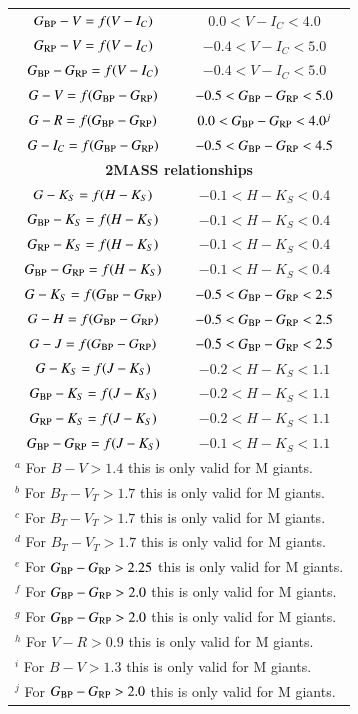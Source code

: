 \documentclass{aa}
\newcommand{\gbp}{\ensuremath{G_{\rm BP}}\xspace}
\newcommand{\grp}{\ensuremath{G_{\rm RP}}\xspace}
\newcommand{\bprp}{\ensuremath{G_{\rm BP}-G_{\rm RP}}\xspace}
\begin{document}
\begin{appendix}
\begin{table}
\begin{center}
\begin{tabular}{c c}
$\gbp-V=f(V-I_C)$				 & $0.0<V-I_C<4.0$\\ 
$\grp-V=f(V-I_C)$		 		 & $-0.4<V-I_C<5.0$\\ 
$\bprp=f(V-I_C)$	 			 & $-0.4<V-I_C<5.0$\\ 
$\gmag-V=f(\bprp)$	 			 & $-0.5<\bprp<5.0$\\
$\gmag-R=f(\bprp)$	 			 & $0.0<\bprp<4.0^j$\\
$\gmag-I_C=f(\bprp)$	 			 & $-0.5<\bprp<4.5$\\
\hline
\multicolumn{2}{c}{\textbf{2MASS relationships}}\\
$G-K_S=f(H-K_S)$			  	  & $-0.1<H-K_S<0.4$\\
 $\gbp-K_S=f(H-K_S)$			  	  & $-0.1<H-K_S<0.4$\\
 $\grp-K_S=f(H-K_S)$			  	  & $-0.1<H-K_S<0.4$\\
  $\bprp=f(H-K_S)$			  	  & $-0.1<H-K_S<0.4$\\
  $\gmag-K_S=f(\bprp)$			  & $-0.5<\bprp<2.5$\\
  $\gmag-H=f(\bprp)$			  	  & $-0.5<\bprp<2.5$\\
  $\gmag-J=f(\bprp)$			  	  & $-0.5<\bprp<2.5$\\
  $G-K_S=f(J-K_S)$			  	  & $-0.2<H-K_S<1.1$\\
  $\gbp-K_S=f(J-K_S)$			  	  & $-0.2<H-K_S<1.1$\\
  $\grp-K_S=f(J-K_S)$			  	  & $-0.2<H-K_S<1.1$\\
  $\bprp=f(J-K_S)$			  	  & $-0.1<H-K_S<1.1$\\
\hline
\multicolumn{2}{l}{\footnotesize{$^a$ For $B-V>1.4$ this is only valid for M giants.}} \\
\multicolumn{2}{l}{\footnotesize{$^b$ For $B_T-V_T>1.7$ this is only valid for M giants.}}\\
\multicolumn{2}{l}{\footnotesize{$^c$ For $B_T-V_T>1.7$ this is only valid for M giants.}} \\
\multicolumn{2}{l}{\footnotesize{$^d$ For $B_T-V_T>1.7$ this is only valid for M giants.}}\\
\multicolumn{2}{l}{\footnotesize{$^e$ For $\bprp>2.25$ this is only valid for M giants.}} \\
\multicolumn{2}{l}{\footnotesize{$^f$ For $\bprp>2.0$ this is only valid for M giants.}}\\
\multicolumn{2}{l}{\footnotesize{$^g$ For $\bprp>2.0$ this is only valid for M giants.}} \\
\multicolumn{2}{l}{\footnotesize{$^h$ For $V-R>0.9$ this is only valid for M giants.}} \\
\multicolumn{2}{l}{\footnotesize{$^i$ For $B-V>1.3$ this is only valid for M giants.}}\\
\multicolumn{2}{l}{\footnotesize{$^j$ For $\bprp>2.0$ this is only valid for M giants.}}\\
\hline
 \end{tabular}
 \end{center}
 \end{table}



\end{appendix}
\end{document}
